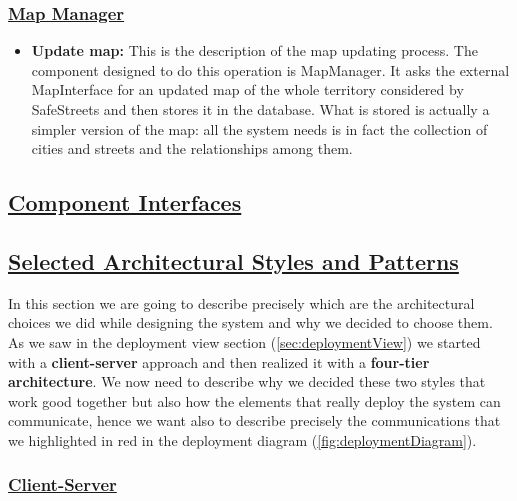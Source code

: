 		\subsubsection[Map Manager]{\hyperlink{toc}{Map Manager}}
		\label{sec.safetyManagerRuntime}
		
		\begin{itemize}
			\item \textbf{Update map:} This is the description of the map updating process. The component designed to do this operation is MapManager. It asks the external MapInterface for an updated map of the whole territory considered by SafeStreets and then stores it in the database. What is stored is actually a simpler version of the map: all the system needs is in fact the collection of cities and streets and the relationships among them.
						
		\end{itemize}
		
	\subsection[Component Interfaces]{\hyperlink{toc}{Component Interfaces}}
		\label{sec:componentInterfaces}
		
	\subsection[Selected Architectural Styles and Patterns]{\hyperlink{toc}{Selected Architectural Styles and Patterns}}
		\label{sec:selectedArchitecturalStylesAndPatterns}
		
		In this section we are going to describe precisely which are the architectural choices we did while designing the system and why we decided to choose them. As we saw in the deployment view section (\ref{sec:deploymentView}) we started with a \textbf{client-server} approach and then realized it with a \textbf{four-tier architecture}. We now need to describe why we decided these two styles that work good together but also how the elements that really deploy the system can communicate, hence we want also to describe precisely the communications that we highlighted in red in the deployment diagram (\autoref{fig:deploymentDiagram}).
		
		\subsubsection[Client-Server]{\hyperlink{toc}{Client-Server}}
			\label{sec:clientServerDecision}
			
